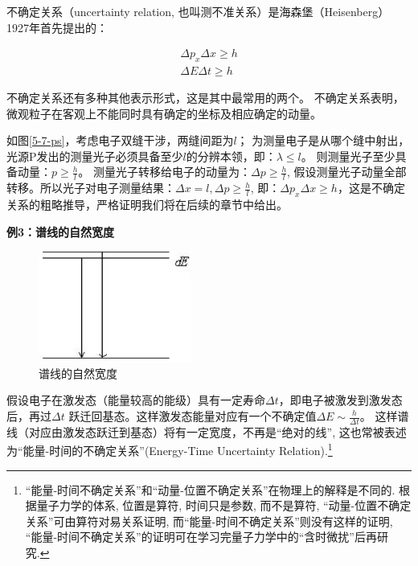 不确定关系（uncertainty relation,
也叫测不准关系）是海森堡（Heisenberg）1927年首先提出的：


\begin{center}
\begin{eqnarray}
  \Delta p_x \Delta x \ge h\\
  \Delta E\Delta t \ge h
\end{eqnarray}
\end{center}

不确定关系还有多种其他表示形式，这是其中最常用的两个。
不确定关系表明，微观粒子在客观上不能同时具有确定的坐标及相应确定的动量。

如图\ref{5-7-ps}，考虑电子双缝干涉，两缝间距为$l$；
为测量电子是从哪个缝中射出，光源P发出的测量光子必须具备至少$l$的分辨本领，即：$\lambda
\le l$。 则测量光子至少具备动量：$p \ge \frac{h}{l}$。
测量光子转移给电子的动量为：$\Delta p \ge \frac{h}{l}$,
假设测量光子动量全部转移。所以光子对电子测量结果：$\Delta x =
l,\Delta p \ge \frac{h}{l}$, 即：$\Delta p_x \Delta x \ge
h$，这是不确定关系的粗略推导，严格证明我们将在后续的章节中给出。

\textbf{例3：谱线的自然宽度}

\begin{figure}[ht]
\begin{center}
\includegraphics[clip,width=5cm]{Duality/5-8.ps}
\caption{谱线的自然宽度}\label{5-8-ps}
\end{center}
\end{figure}



假设电子在激发态（能量较高的能级）具有一定寿命$\Delta
t$，即电子被激发到激发态后，再过$\Delta t$
跃迁回基态。这样激发态能量对应有一个不确定值$\Delta E \sim
\frac{h}{{\Delta t}}$。
这样谱线（对应由激发态跃迁到基态）将有一定宽度，不再是``绝对的线'',
这也常被表述为``能量-时间的不确定关系''(Energy-Time Uncertainty
Relation).\footnote{
``能量-时间不确定关系''和``动量-位置不确定关系''在物理上的解释是不同的.
根据量子力学的体系, 位置是算符, 时间只是参数, 而不是算符,
``动量-位置不确定关系''可由算符对易关系证明,
而``能量-时间不确定关系''则没有这样的证明,
``能量-时间不确定关系''的证明可在学习完量子力学中的``含时微扰''后再研究.}



